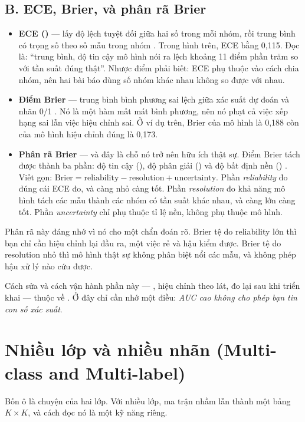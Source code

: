 \documentclass[../../deep_learning.tex]{subfiles}
\begin{document}
\subsection{B. ECE, Brier, và phân rã Brier}
\begin{itemize}
\item \textbf{ECE ()} --- lấy độ lệch tuyệt đối giữa hai số trong mỗi nhóm, rồi trung bình có trọng số theo số mẫu trong nhóm \cite{naeini2015calibrated}. Trong hình trên, ECE bằng 0{,}115. Đọc là: ``trung bình, độ tin cậy mô hình nói ra lệch khoảng 11 điểm phần trăm so với tần suất đúng thật''. Nhược điểm phải biết: ECE phụ thuộc vào cách chia nhóm, nên hai bài báo dùng số nhóm khác nhau không so được với nhau.
\item \textbf{Điểm Brier} --- trung bình bình phương sai lệch giữa xác suất dự đoán và nhãn 0/1 \cite{brier1950verification}. Nó là một hàm mất mát bình phương, nên nó phạt cả việc xếp hạng sai lẫn việc hiệu chỉnh sai. Ở ví dụ trên, Brier của mô hình là 0{,}188 còn của mô hình hiệu chỉnh đúng là 0{,}173.
\item \textbf{Phân rã Brier} --- và đây là chỗ nó trở nên hữu ích thật sự. Điểm Brier tách được thành ba phần: độ tin cậy (), độ phân giải () và độ bất định nền () \cite{murphy1973partition}. Viết gọn: \(\text{Brier} = \text{reliability} - \text{resolution} + \text{uncertainty}\). Phần \emph{reliability} đo đúng cái ECE đo, và càng nhỏ càng tốt. Phần \emph{resolution} đo khả năng mô hình tách các mẫu thành các nhóm có tần suất khác nhau, và càng lớn càng tốt. Phần \emph{uncertainty} chỉ phụ thuộc tỉ lệ nền, không phụ thuộc mô hình.
\end{itemize}

Phân rã này đáng nhớ vì nó cho một chẩn đoán rõ. Brier tệ do reliability lớn thì bạn chỉ cần hiệu chỉnh lại đầu ra, một việc rẻ và hậu kiểm được. Brier tệ do resolution nhỏ thì mô hình thật sự không phân biệt nổi các mẫu, và không phép hậu xử lý nào cứu được.

Cách sửa và cách vận hành phần này --- , hiệu chỉnh theo lát, đo lại sau khi triển khai --- thuộc về . Ở đây chỉ cần nhớ một điều: \emph{AUC cao không cho phép bạn tin con số xác suất}.

\section{Nhiều lớp và nhiều nhãn (Multi-class and Multi-label)}
Bốn ô là chuyện của hai lớp. Với nhiều lớp, ma trận nhầm lẫn thành một bảng \(K \times K\), và cách đọc nó là một kỹ năng riêng.
\end{document}
